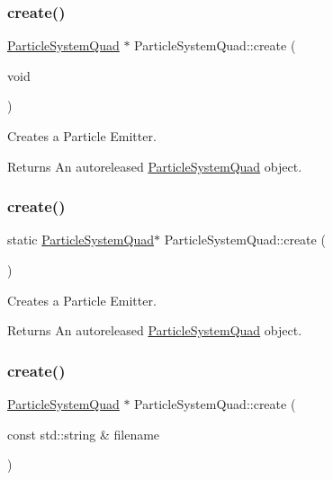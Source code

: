\subsubsection{\texorpdfstring{create()}{create()}\hspace{0.1cm}{\footnotesize\ttfamily [1/6]}}
{\footnotesize\ttfamily \hyperlink{classParticleSystemQuad}{Particle\+System\+Quad} $\ast$ Particle\+System\+Quad\+::create (\begin{DoxyParamCaption}\item[{void}]{ }\end{DoxyParamCaption})\hspace{0.3cm}{\ttfamily [static]}}

Creates a Particle Emitter.

\begin{DoxyReturn}{Returns}
An autoreleased \hyperlink{classParticleSystemQuad}{Particle\+System\+Quad} object. 
\end{DoxyReturn}
\mbox{\label{classParticleSystemQuad_a0cd236071ffdde34ccbe1a38f6c6ebe2}} 
\subsubsection{\texorpdfstring{create()}{create()}\hspace{0.1cm}{\footnotesize\ttfamily [2/6]}}
{\footnotesize\ttfamily static \hyperlink{classParticleSystemQuad}{Particle\+System\+Quad}$\ast$ Particle\+System\+Quad\+::create (\begin{DoxyParamCaption}{ }\end{DoxyParamCaption})\hspace{0.3cm}{\ttfamily [static]}}

Creates a Particle Emitter.

\begin{DoxyReturn}{Returns}
An autoreleased \hyperlink{classParticleSystemQuad}{Particle\+System\+Quad} object. 
\end{DoxyReturn}
\mbox{\label{classParticleSystemQuad_a5c79a0789b3b6313b992dc091bbb8418}} 
\subsubsection{\texorpdfstring{create()}{create()}\hspace{0.1cm}{\footnotesize\ttfamily [3/6]}}
{\footnotesize\ttfamily \hyperlink{classParticleSystemQuad}{Particle\+System\+Quad} $\ast$ Particle\+System\+Quad\+::create (\begin{DoxyParamCaption}\item[{const std\+::string \&}]{filename }\end{DoxyParamCaption})\hspace{0.3cm}{\ttfamily [static]}}


